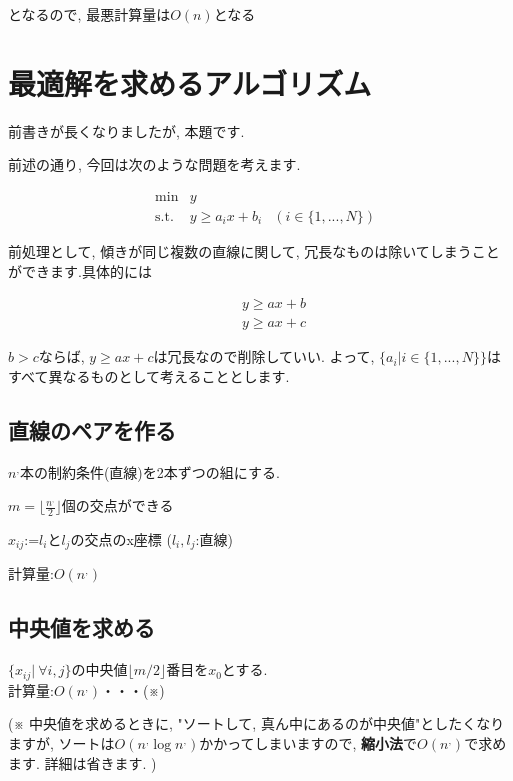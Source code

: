 \documentclass[dvipdfmx,12pt]{jsarticle}%
\begin{document}
となるので, 最悪計算量は$O(n)$となる


\newpage

\section{最適解を求めるアルゴリズム}
前書きが長くなりましたが, 本題です.


前述の通り, 今回は次のような問題を考えます.

\begin{equation*}
  \begin{aligned}
      & \text{min}
          & y& \\
      & \text{s.t.}
          & y \geq a_ix + b_i 
          &(i \in \{1,...,N\})
  \end{aligned}
\end{equation*}




前処理として, 傾きが同じ複数の直線に関して, 冗長なものは除いてしまうことができます.具体的には

\begin{eqnarray*}
  \qquad y\geq ax+b \\
  \qquad y\geq ax+c
\end{eqnarray*}


$b>c$ならば, $ y\geq ax+c$は冗長なので削除していい.
よって, $\{a_i|i \in \{1,...,N\}\}$はすべて異なるものとして考えることとします.

\subsection{直線のペアを作る}
$n^,$本の制約条件(直線)を2本ずつの組にする.

$m=\lfloor \frac{n^{,}}{2} \rfloor$個の交点ができる

$x_{ij}$:=$l_i$と$l_j$の交点のx座標 ($l_i,l_j$:直線)

計算量:$O(n^{,})$

\subsection{中央値を求める}
$\{x_{ij} | ~\forall{i,j}\}$の中央値$\lfloor m/2 \rfloor$番目を$x_0$とする.\\
計算量:$O(n^{,})$・・・(※)

(※ 中央値を求めるときに, "ソートして, 真ん中にあるのが中央値"としたくなりますが, ソートは$O(n^{,}\log n^{,})$かかってしまいますので, {\bf 縮小法}で$O(n^{,})$で求めます. 詳細は省きます. )
\end{document}
